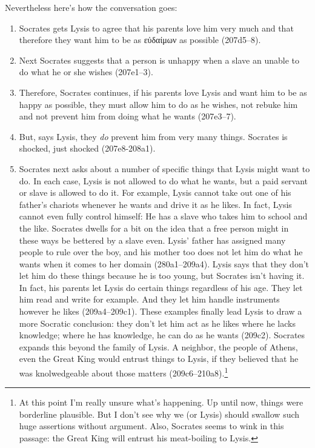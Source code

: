 \documentclass[11pt]{article}
\begin{document}
Nevertheless here's how the conversation goes:

\begin{enumerate}
    \item Socrates gets Lysis to agree that his parents love him very much and that therefore they want him to be as {\g εὐδαίμων} as possible (207d5--8).
    \item Next Socrates suggests that a person is unhappy when a slave an unable to do what he or she wishes (207e1--3).
    \item Therefore, Socrates continues, if his parents love Lysis and want him to be as happy as possible, they must allow him to do as he wishes, not rebuke him and not prevent him from doing what he wants (207e3--7).
    \item But, says Lysis, they \emph{do} prevent him from very many things.  Socrates is shocked, just shocked (207e8-208a1).
    \item Socrates next asks about a number of specific things that Lysis might want to do.  In each case, Lysis is not allowed to do what he wants, but a paid servant or slave is allowed to do it.  For example, Lysis cannot take out one of his father's chariots whenever he wants and drive it as he likes.  In fact, Lysis cannot even fully control himself: He has a slave who takes him to school and the like.  Socrates dwells for a bit on the idea that a free person might in these ways be bettered by a slave even.  Lysis' father has assigned many people to rule over the boy, and his mother too does not let him do what he wants when it comes to her domain (280a1--209a4).
        Lysis says that they don't let him do these things because he is too young, but Socrates isn't having it.  In fact, his parents let Lysis do certain things regardless of his age.  They let him read and write for example.  And they let him handle instruments however he likes (209a4--209c1).
        These examples finally lead Lysis to draw a more Socratic conclusion: they don't let him act as he likes where he lacks knowledge; where he has knowledge, he can do as he wants (209c2).
        Socrates expands this beyond the family of Lysis.  A neighbor, the people of Athens, even the Great King would entrust things to Lysis, if they believed that he was knolwedgeable about those matters (209c6--210a8).\footnote{At this point I'm really unsure what's happening.  Up until now, things were borderline plausible.  But I don't see why we (or Lysis) should swallow such huge assertions without argument.  Also, Socrates seems to wink in this passage: the Great King will entrust his meat-boiling to Lysis.}

\end{enumerate}
\end{document}
